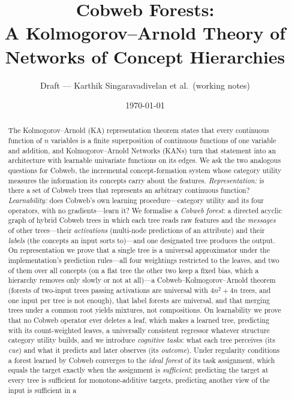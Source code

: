 \documentclass[11pt]{article}
\title{Cobweb Forests:\\ A Kolmogorov--Arnold Theory of Networks of Concept Hierarchies}
\author{Draft --- Karthik Singaravadivelan et al.\ (working notes)}
\date{\today}
\theoremstyle{definition}
\theoremstyle{remark}
\begin{document}
\maketitle

\begin{abstract}
The Kolmogorov--Arnold (KA) representation theorem states that every continuous
function of $n$ variables is a finite superposition of continuous functions of one
variable and addition, and Kolmogorov--Arnold Networks (KANs) turn that statement into
an architecture with learnable univariate functions on its edges.  We ask the two
analogous questions for Cobweb, the incremental concept-formation system whose
category utility measures the information its concepts carry about the features.
\emph{Representation:} is there a set of Cobweb trees that represents an arbitrary
continuous function?  \emph{Learnability:} does Cobweb's own learning
procedure---category utility and its four operators, with no gradients---learn it?
We formalise a \emph{Cobweb forest}: a directed acyclic graph of hybrid Cobweb trees in
which each tree reads raw features and the \emph{messages} of other trees---their
\emph{activations} (multi-node predictions of an attribute) and their \emph{labels}
(the concepts an input sorts to)---and one designated tree produces the output.
On representation we prove that a single tree is a universal approximator under the
implementation's prediction rules---all four weightings restricted to the leaves, and two
of them over all concepts (on a flat tree the other two keep a fixed bias, which a
hierarchy removes only slowly or not at all)---a
Cobweb--Kolmogorov--Arnold theorem (forests of two-input trees passing activations are
universal with $4n^2+4n$ trees, and one input per tree is not enough), that label forests
are universal, and that merging trees under a common root yields mixtures, not
compositions.  On learnability we prove that no Cobweb operator ever deletes a leaf,
which makes a learned tree, predicting with its count-weighted leaves, a universally
consistent regressor whatever structure category utility builds, and we introduce \emph{cognitive tasks}: what each tree
perceives (its \emph{cue}) and what it predicts and later observes (its
\emph{outcome}).  Under regularity conditions a forest learned by Cobweb converges to the
\emph{ideal forest} of its task assignment, which equals the target exactly when the assignment is
\emph{sufficient}; predicting the target at every tree is sufficient for
monotone-additive targets, predicting another view of the input is sufficient in a

\end{abstract}
\end{document}
